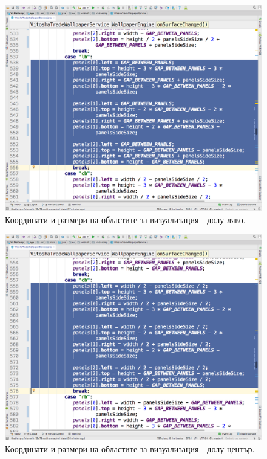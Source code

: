 \documentclass[book,14pt,oneside,openany]{memoir}
\begin{document}
\begin{figure}[h]
  \centering
  \includegraphics[height=0.45\pdfpageheight]{pic0074}
  \caption{Координати и размери на областите за визуализация - долу-ляво.}
\label{fig:pic0074}
\end{figure}
\FloatBarrier

\begin{figure}[h]
  \centering
  \includegraphics[height=0.45\pdfpageheight]{pic0075}
  \caption{Координати и размери на областите за визуализация - долу-център.}
\label{fig:pic0075}
\end{figure}
\FloatBarrier
\end{document}
